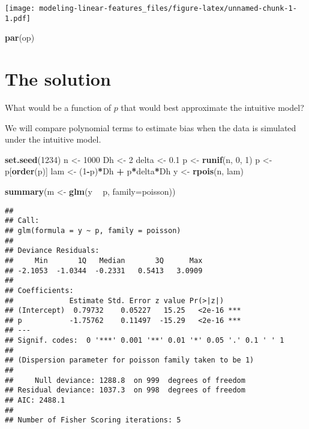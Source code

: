 \documentclass[]{article}
\newenvironment{Shaded}{\begin{snugshade}}{\end{snugshade}}
\newcommand{\KeywordTok}[1]{\textcolor[rgb]{0.13,0.29,0.53}{\textbf{#1}}}
\newcommand{\DataTypeTok}[1]{\textcolor[rgb]{0.13,0.29,0.53}{#1}}
\newcommand{\DecValTok}[1]{\textcolor[rgb]{0.00,0.00,0.81}{#1}}
\newcommand{\FloatTok}[1]{\textcolor[rgb]{0.00,0.00,0.81}{#1}}
\newcommand{\StringTok}[1]{\textcolor[rgb]{0.31,0.60,0.02}{#1}}
\newcommand{\OperatorTok}[1]{\textcolor[rgb]{0.81,0.36,0.00}{\textbf{#1}}}
\newcommand{\NormalTok}[1]{#1}
\begin{document}
\texttt{[image: modeling-linear-features\_files/figure-latex/unnamed-chunk-1-1.pdf]}

\begin{Shaded}
\begin{Highlighting}[]
\KeywordTok{par}\NormalTok{(op)}
\end{Highlighting}
\end{Shaded}

\section{The solution}\label{the-solution}

What would be a function of \(p\) that would best approximate the
intuitive model?

We will compare polynomial terms to estimate bias when the data is
simulated under the intuitive model.

\begin{Shaded}
\begin{Highlighting}[]
\KeywordTok{set.seed}\NormalTok{(}\DecValTok{1234}\NormalTok{)}
\NormalTok{n <-}\StringTok{ }\DecValTok{1000}
\NormalTok{Dh <-}\StringTok{ }\DecValTok{2}
\NormalTok{delta <-}\StringTok{ }\FloatTok{0.1}
\NormalTok{p <-}\StringTok{ }\KeywordTok{runif}\NormalTok{(n, }\DecValTok{0}\NormalTok{, }\DecValTok{1}\NormalTok{)}
\NormalTok{p <-}\StringTok{ }\NormalTok{p[}\KeywordTok{order}\NormalTok{(p)]}
\NormalTok{lam <-}\StringTok{ }\NormalTok{(}\DecValTok{1}\OperatorTok{-}\NormalTok{p)}\OperatorTok{*}\NormalTok{Dh }\OperatorTok{+}\StringTok{ }\NormalTok{p}\OperatorTok{*}\NormalTok{delta}\OperatorTok{*}\NormalTok{Dh}
\NormalTok{y <-}\StringTok{ }\KeywordTok{rpois}\NormalTok{(n, lam)}

\KeywordTok{summary}\NormalTok{(m <-}\StringTok{ }\KeywordTok{glm}\NormalTok{(y }\OperatorTok{~}\StringTok{ }\NormalTok{p, }\DataTypeTok{family=}\NormalTok{poisson))}
\end{Highlighting}
\end{Shaded}

\begin{verbatim}
## 
## Call:
## glm(formula = y ~ p, family = poisson)
## 
## Deviance Residuals: 
##     Min       1Q   Median       3Q      Max  
## -2.1053  -1.0344  -0.2331   0.5413   3.0909  
## 
## Coefficients:
##             Estimate Std. Error z value Pr(>|z|)    
## (Intercept)  0.79732    0.05227   15.25   <2e-16 ***
## p           -1.75762    0.11497  -15.29   <2e-16 ***
## ---
## Signif. codes:  0 '***' 0.001 '**' 0.01 '*' 0.05 '.' 0.1 ' ' 1
## 
## (Dispersion parameter for poisson family taken to be 1)
## 
##     Null deviance: 1288.8  on 999  degrees of freedom
## Residual deviance: 1037.3  on 998  degrees of freedom
## AIC: 2488.1
## 
## Number of Fisher Scoring iterations: 5
\end{verbatim}
\end{document}
